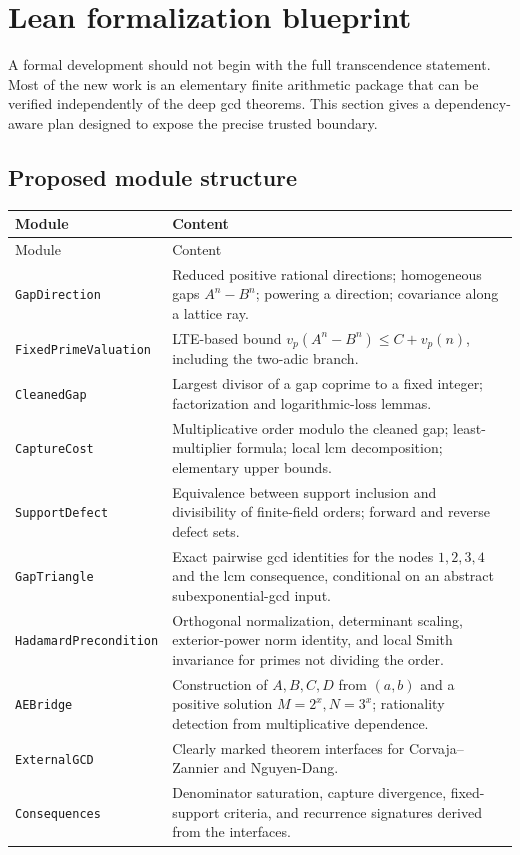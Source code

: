 \documentclass[11pt,oneside]{article}
\theoremstyle{definition}
\theoremstyle{remark}
\begin{document}
\section{Lean formalization blueprint}
\label{sec:lean}

A formal development should not begin with the full transcendence statement.  Most of the
new work is an elementary finite arithmetic package that can be verified independently of
the deep gcd theorems.  This section gives a dependency-aware plan designed to expose the
precise trusted boundary.

\subsection{Proposed module structure}

\begin{longtable}{p{}p{}}
\toprule
Module & Content \\
\midrule
\endfirsthead
\toprule
Module & Content \\
\midrule
\endhead
\texttt{GapDirection} & Reduced positive rational directions; homogeneous gaps
$A^n-B^n$; powering a direction; covariance along a lattice ray. \\
\texttt{FixedPrimeValuation} & LTE-based bound
$v_p(A^n-B^n)\le C+v_p(n)$, including the two-adic branch. \\
\texttt{CleanedGap} & Largest divisor of a gap coprime to a fixed integer; factorization and
logarithmic-loss lemmas. \\
\texttt{CaptureCost} & Multiplicative order modulo the cleaned gap; least-multiplier formula;
local lcm decomposition; elementary upper bounds. \\
\texttt{SupportDefect} & Equivalence between support inclusion and divisibility of finite-field
orders; forward and reverse defect sets. \\
\texttt{GapTriangle} & Exact pairwise gcd identities for the nodes $1,2,3,4$ and the lcm
consequence, conditional on an abstract subexponential-gcd input. \\
\texttt{HadamardPrecondition} & Orthogonal normalization, determinant scaling, exterior-power
norm identity, and local Smith invariance for primes not dividing the order. \\
\texttt{AEBridge} & Construction of $A,B,C,D$ from $(a,b)$ and a positive solution
$M=2^x,N=3^x$; rationality detection from multiplicative dependence. \\
\texttt{ExternalGCD} & Clearly marked theorem interfaces for Corvaja--Zannier and
Nguyen-Dang. \\
\texttt{Consequences} & Denominator saturation, capture divergence, fixed-support criteria,
and recurrence signatures derived from the interfaces. \\
\bottomrule
\end{longtable}
\end{document}
